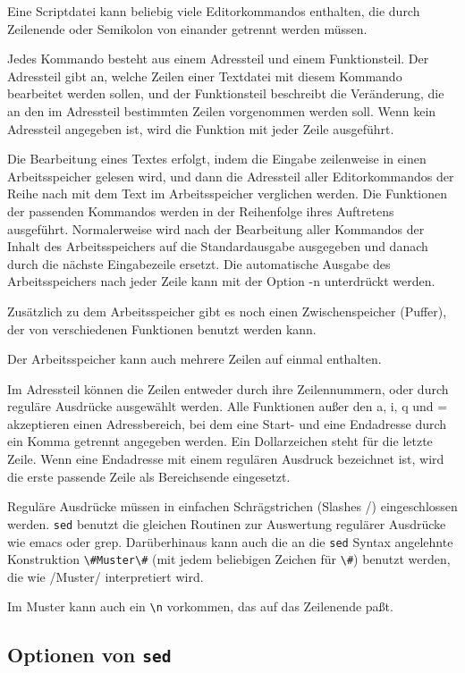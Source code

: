 \documentclass[12pt,]{article}
\begin{document}
Eine Scriptdatei kann beliebig viele Editorkommandos enthalten, die
durch Zeilenende oder Semikolon von einander getrennt werden müssen.

Jedes Kommando besteht aus einem Adressteil und einem Funktionsteil. Der
Adressteil gibt an, welche Zeilen einer Textdatei mit diesem Kommando
bearbeitet werden sollen, und der Funktionsteil beschreibt die
Veränderung, die an den im Adressteil bestimmten Zeilen vorgenommen
werden soll. Wenn kein Adressteil angegeben ist, wird die Funktion mit
jeder Zeile ausgeführt.

Die Bearbeitung eines Textes erfolgt, indem die Eingabe zeilenweise in
einen Arbeitsspeicher gelesen wird, und dann die Adressteil aller
Editorkommandos der Reihe nach mit dem Text im Arbeitsspeicher
verglichen werden. Die Funktionen der passenden Kommandos werden in der
Reihenfolge ihres Auftretens ausgeführt. Normalerweise wird nach der
Bearbeitung aller Kommandos der Inhalt des Arbeitsspeichers auf die
Standardausgabe ausgegeben und danach durch die nächste Eingabezeile
ersetzt. Die automatische Ausgabe des Arbeitsspeichers nach jeder Zeile
kann mit der Option -n unterdrückt werden.

Zusätzlich zu dem Arbeitsspeicher gibt es noch einen Zwischenspeicher
(Puffer), der von verschiedenen Funktionen benutzt werden kann.

Der Arbeitsspeicher kann auch mehrere Zeilen auf einmal enthalten.

Im Adressteil können die Zeilen entweder durch ihre Zeilennummern, oder
durch reguläre Ausdrücke ausgewählt werden. Alle Funktionen außer den a,
i, q und = akzeptieren einen Adressbereich, bei dem eine Start- und eine
Endadresse durch ein Komma getrennt angegeben werden. Ein Dollarzeichen
steht für die letzte Zeile. Wenn eine Endadresse mit einem regulären
Ausdruck bezeichnet ist, wird die erste passende Zeile als Bereichsende
eingesetzt.

Reguläre Ausdrücke müssen in einfachen Schrägstrichen (Slashes /)
eingeschlossen werden. \texttt{sed} benutzt die gleichen Routinen zur
Auswertung regulärer Ausdrücke wie emacs oder grep. Darüberhinaus kann
auch die an die \texttt{sed} Syntax angelehnte Konstruktion
\texttt{\textbackslash{}\#Muster\textbackslash{}\#} (mit jedem
beliebigen Zeichen für \texttt{\textbackslash{}\#}) benutzt werden, die
wie /Muster/ interpretiert wird.

Im Muster kann auch ein \texttt{\textbackslash{}n} vorkommen, das auf
das Zeilenende paßt.

\subsection{\texorpdfstring{Optionen von
\texttt{sed}}{Optionen von sed}}\label{optionen-von-sed}
\end{document}
